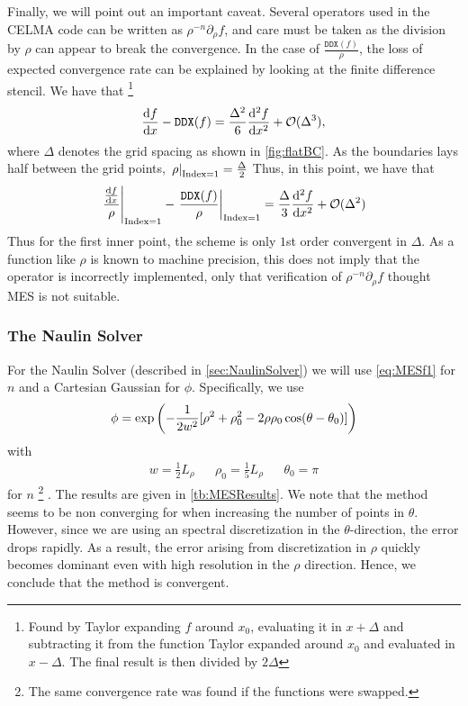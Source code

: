 Finally, we will point out an important caveat.
Several operators used in the CELMA code can be written as $\rho^{-n}\partial_\rho f$, and care must be taken as the division by $\rho$ can appear to break the convergence.
In the case of $\frac{\texttt{DDX}(f)}{\rho}$, the loss of expected convergence rate can be explained by looking at the finite difference stencil.
We have that%
%
\footnote{
Found by Taylor expanding $f$ around $x_0$, evaluating it in $x+\Delta$ and subtracting it from the function Taylor expanded around $x_0$ and evaluated in $x-\Delta$. The final result is then divided by $2\Delta$
}
%
\begin{align*}
    \frac{\text{d}{f}}{\text{d}{x}} - \texttt{DDX}(f) =
    \frac{\Delta^2}{6}\frac{\text{d}{^2f}}{\text{d}{x^2}} + \mathcal{O}(\Delta^3),
\end{align*}
%
where $\Delta$ denotes the grid spacing as shown in \cref{fig:flatBC}.
As the boundaries lays half between the grid points, $\left.\rho\right|_{\text{Index}=1}=\frac{\Delta}{2}$
Thus, in this point, we have that
%
\begin{align*}
    \left.\frac{\frac{\text{d}{f}}{\text{d}{x}}}{\rho}\right|_{\text{Index}=1}
    - \left.\frac{\texttt{DDX}(f)}{\rho}\right|_{\text{Index}=1}
    = \frac{\Delta}{3}\frac{\text{d}{^2f}}{\text{d}{x^2}} + \mathcal{O}(\Delta^2)
\end{align*}
%
Thus for the first inner point, the scheme is only $1$st order convergent in $\Delta$.
As a function like $\rho$ is known to machine precision, this does not imply that the operator is incorrectly implemented, only that verification of $\rho^{-n}\partial_\rho f$ thought MES is not suitable.

\subsubsection{The Naulin Solver}
%
For the Naulin Solver (described in \cref{sec:NaulinSolver}) we will use \cref{eq:MESf1} for $n$ and a Cartesian Gaussian for $\phi$.
Specifically, we use
%
\begin{align}
\phi = \exp\left(-\frac{1}{2w^2}[\rho^2 + \rho_0^2 - 2\rho\rho_0\cos(\theta - \theta_0)] \right)
\label{eq:MESf2}
\end{align}
%
with
%
\begin{align*}
& w = \frac{1}{2}L_\rho &
& \rho_0 = \frac{1}{5}L_\rho &
& \theta_0 = \pi &
\end{align*}
%
for $n$%
\footnote{The same convergence rate was found if the functions were swapped.}%
.
The results are given in \cref{tb:MESResults}.
We note that the method seems to be non converging for when increasing the number of points in $\theta$.
However, since we are using an spectral discretization in the $\theta$-direction, the error drops rapidly.
As a result, the error arising from discretization in $\rho$ quickly becomes dominant even with high resolution in the $\rho$ direction.
Hence, we conclude that the method is convergent.

